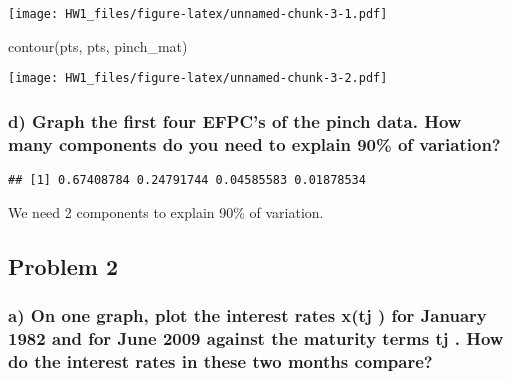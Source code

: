 \documentclass[
]{article}
\newenvironment{Shaded}{\begin{snugshade}}{\end{snugshade}}
\newcommand{\AttributeTok}[1]{\textcolor[rgb]{0.77,0.63,0.00}{#1}}
\newcommand{\DecValTok}[1]{\textcolor[rgb]{0.00,0.00,0.81}{#1}}
\newcommand{\FunctionTok}[1]{\textcolor[rgb]{0.00,0.00,0.00}{#1}}
\newcommand{\NormalTok}[1]{#1}
\newcommand{\OtherTok}[1]{\textcolor[rgb]{0.56,0.35,0.01}{#1}}
\newcommand{\SpecialCharTok}[1]{\textcolor[rgb]{0.00,0.00,0.00}{#1}}
\begin{document}
\texttt{[image: HW1\_files/figure-latex/unnamed-chunk-3-1.pdf]}

\begin{Shaded}
\begin{Highlighting}[]
\FunctionTok{contour}\NormalTok{(pts, pts, pinch\_mat)}
\end{Highlighting}
\end{Shaded}

\texttt{[image: HW1\_files/figure-latex/unnamed-chunk-3-2.pdf]}

\hypertarget{d-graph-the-first-four-efpcs-of-the-pinch-data.-how-many-components-do-you-need-to-explain-90-of-variation}{%
\subsubsection{d) Graph the first four EFPC's of the pinch data. How
many components do you need to explain 90\% of
variation?}\label{d-graph-the-first-four-efpcs-of-the-pinch-data.-how-many-components-do-you-need-to-explain-90-of-variation}}

\begin{Shaded}
\end{Shaded}

\begin{verbatim}
## [1] 0.67408784 0.24791744 0.04585583 0.01878534
\end{verbatim}

We need 2 components to explain 90\% of variation.

\hypertarget{problem-2}{%
\subsection{Problem 2}\label{problem-2}}

\hypertarget{a-on-one-graph-plot-the-interest-rates-xtj-for-january-1982-and-for-june-2009-against-the-maturity-terms-tj-.-how-do-the-interest-rates-in-these-two-months-compare}{%
\subsubsection{a) On one graph, plot the interest rates x(tj ) for
January 1982 and for June 2009 against the maturity terms tj . How do
the interest rates in these two months
compare?}\label{a-on-one-graph-plot-the-interest-rates-xtj-for-january-1982-and-for-june-2009-against-the-maturity-terms-tj-.-how-do-the-interest-rates-in-these-two-months-compare}}
\end{document}
